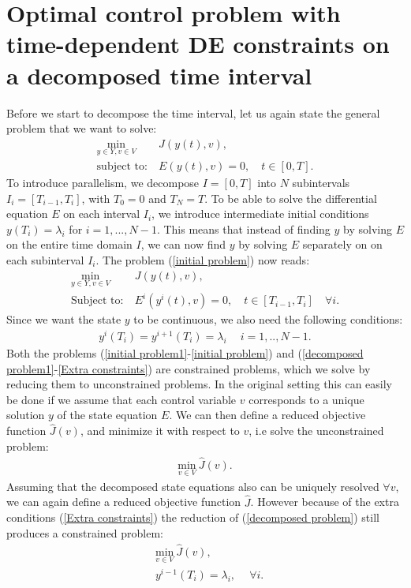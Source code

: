 \section{Optimal control problem with time-dependent DE constraints on a decomposed time interval} \label{decomp_sec}
Before we start to decompose the time interval, let us again state the general problem that we want to solve:
\begin{align}
\underset{y\in Y,v\in V}{\text{min}} \ &J(y(t),v), \label{initial problem1}\\
\textrm{subject to:} \ &E(y(t),v)=0, \quad t\in [0,T]. \label{initial problem}
\end{align}
To introduce parallelism, we decompose $I=[0,T]$ into $N$ subintervals $I_i=[T_{i-1},T_i]$, with $T_0=0$ and $T_N=T$. To be able to solve the differential equation $E$ on each interval $I_i$, we introduce intermediate initial conditions $y(T_i)=\lambda_i$ for $i=1,...,N-1$. This means that instead of finding $y$ by solving $E$ on the entire time domain $I$, we can now find $y$ by solving $E$ separately on on each subinterval $I_i$. The problem (\ref{initial problem}) now reads:
\begin{align}
\underset{y\in Y,v\in V}{\text{min}} \ &J(y(t),v),  \label{decomposed problem1}\\
\textrm{Subject to:} \ &E^i(y^i(t),v)=0, \quad t\in [T_{i-1},T_i] \quad \forall i. \label{decomposed problem}
\end{align} 
Since we want the state $y$ to be continuous, we also need the following conditions:
\begin{align}
y^{i}(T_i)=y^{i+1}(T_i)=\lambda_i \quad \ i=1,..,N-1. \label{Extra constraints}
\end{align} 
Both the problems (\ref{initial problem1}-\ref{initial problem}) and (\ref{decomposed problem1}-\ref{Extra constraints}) are constrained problems, which we solve by reducing them to unconstrained problems. In the original setting this can easily be done if we assume that each control variable $v$ corresponds to a unique solution $y$ of the state equation $E$. We can then define a reduced objective function $\hat{J}(v)$, and minimize it with respect to $v$, i.e solve the unconstrained problem:
\begin{align*}
\underset{v\in V}{\text{min}} \ \hat J(v).
\end{align*} 
Assuming that the decomposed state equations also can be uniquely resolved $\forall v$, we can again define a reduced objective function  $\hat{J}$. However because of the extra conditions (\ref{Extra constraints}) the reduction of (\ref{decomposed problem}) still produces a constrained problem:
\begin{align}
&\underset{v\in V}{\text{min}} \ \hat J(v), \label{constrained reduced j}\\
&y^{i-1}(T_i)=\lambda_i, \ \quad \forall i. \label{constrained reduced}
\end{align} 
